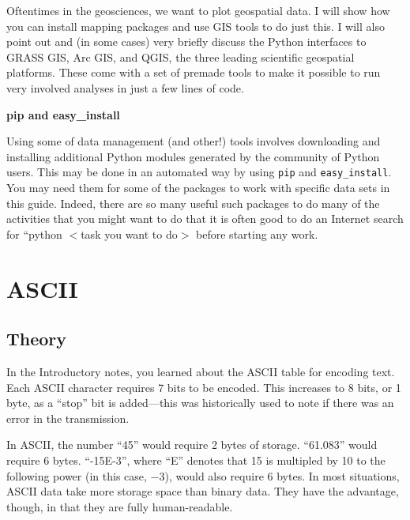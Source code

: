 \documentclass[a4paper,10pt]{scrartcl}
\begin{document}
Oftentimes in the geosciences, we want to plot geospatial data. I will show how you can install mapping packages and use GIS tools to do just this. I will also point out and (in some cases) very briefly discuss the Python interfaces to GRASS GIS, Arc GIS, and QGIS, the three leading scientific geospatial platforms. These come with a set of premade tools to make it possible to run very involved analyses in just a few lines of code.

\begin{framed}
\noindent\textbf{pip and easy\_install}

Using some of data management (and other!) tools involves downloading and installing additional Python modules generated by the community of Python users. This may be done in an automated way by using \lstinline{pip} and \lstinline{easy_install}. You may need them for some of the packages to work with specific data sets in this guide. Indeed, there are so many useful such packages to do many of the activities that you might want to do that it is often good to do an Internet search for ``python $<$task you want to do$>$ before starting any work.
\end{framed}

\section{ASCII}

\subsection{Theory}

In the Introductory notes, you learned about the ASCII table for encoding text. Each ASCII character requires 7 bits to be encoded. This increases to 8 bits, or 1 byte, as a ``stop'' bit is added---this was historically used to note if there was an error in the transmission.

In ASCII, the number ``45'' would require 2 bytes of storage. ``61.083'' would require 6 bytes. ``-15E-3'', where ``E'' denotes that 15 is multipled by 10 to the following power (in this case, $-3$), would also require 6 bytes. In most situations, ASCII data take more storage space than binary data. They have the advantage, though, in that they are fully human-readable.
\end{document}
